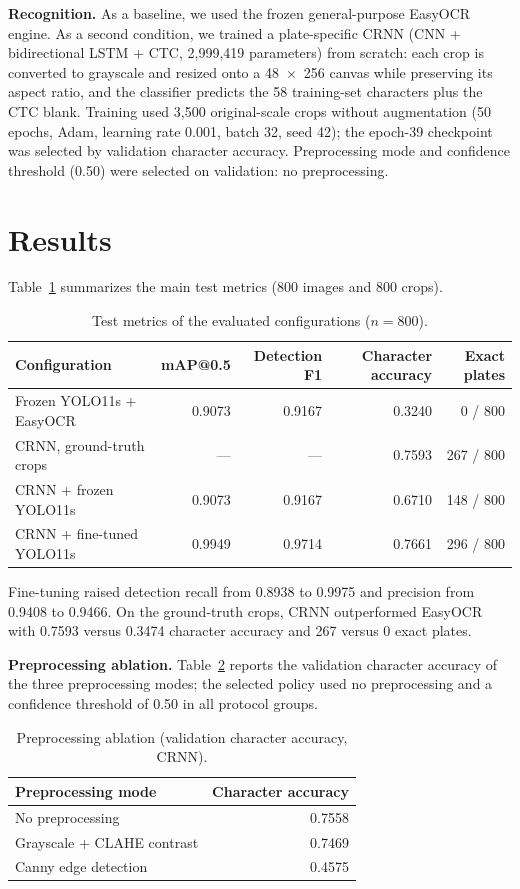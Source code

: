 \documentclass[10pt]{article}
\begin{document}
\textbf{Recognition.} As a baseline, we used the frozen general-purpose
EasyOCR engine. As a second condition, we trained a plate-specific CRNN
(CNN + bidirectional LSTM + CTC, 2{,}999{,}419 parameters) from scratch:
each crop is converted to grayscale and resized onto a 48~$\times$~256
canvas while preserving its aspect ratio, and the classifier predicts the
58 training-set characters plus the CTC blank. Training used 3{,}500
original-scale crops without augmentation (50 epochs, Adam, learning rate
0.001, batch 32, seed 42); the epoch-39 checkpoint was selected by
validation character accuracy. Preprocessing mode and confidence
threshold (0.50) were selected on validation: no preprocessing.

\section{Results}

Table~\ref{tab:main} summarizes the main test metrics (800 images and
800 crops).

\begin{table}[H]
\centering
\small
\begin{tabular}{@{}lrrrr@{}}
\toprule
Configuration & mAP@0.5 & Detection F1 & Character accuracy & Exact plates \\
\midrule
Frozen YOLO11s + EasyOCR & 0.9073 & 0.9167 & 0.3240 & 0 / 800 \\
CRNN, ground-truth crops & --- & --- & 0.7593 & 267 / 800 \\
CRNN + frozen YOLO11s & 0.9073 & 0.9167 & 0.6710 & 148 / 800 \\
CRNN + fine-tuned YOLO11s & 0.9949 & 0.9714 & 0.7661 & 296 / 800 \\
\bottomrule
\end{tabular}
\caption{Test metrics of the evaluated configurations ($n = 800$).}
\label{tab:main}
\end{table}

Fine-tuning raised detection recall from 0.8938 to 0.9975 and precision
from 0.9408 to 0.9466. On the ground-truth crops, CRNN outperformed
EasyOCR with 0.7593 versus 0.3474 character accuracy and 267 versus 0
exact plates.

\textbf{Preprocessing ablation.} Table~\ref{tab:ablation} reports the
validation character accuracy of the three preprocessing modes; the
selected policy used no preprocessing and a confidence threshold of
0.50 in all protocol groups.

\begin{table}[H]
\centering
\small
\begin{tabular}{@{}lr@{}}
\toprule
Preprocessing mode & Character accuracy \\
\midrule
No preprocessing & 0.7558 \\
Grayscale + CLAHE contrast & 0.7469 \\
Canny edge detection & 0.4575 \\
\bottomrule
\end{tabular}
\caption{Preprocessing ablation (validation character accuracy, CRNN).}
\label{tab:ablation}
\end{table}
\end{document}
